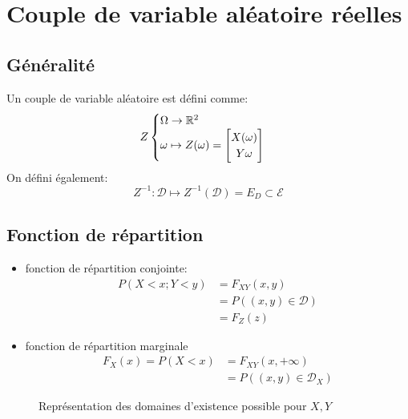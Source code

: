 \documentclass[main.tex]{subfiles}
\begin{document}
\section{Couple de variable aléatoire réelles}
\subsection{Généralité}
\begin{defin}
  Un couple de variable aléatoire est défini comme:
  \[
    Z
    \begin{cases}
      \Omega \to \mathbb{R}^2\\
      \omega \mapsto Z(\omega) = \begin{bmatrix} X(\omega)\\Y{\omega} \end{bmatrix}
    \end{cases}
  \]
  On défini également:
  \[
    Z^{-1} : \mathcal{D} \mapsto Z^{-1}(\mathcal{D}) = E_D \subset \mathcal{E}
  \]
\end{defin}
\subsection{Fonction de répartition}
\begin{defin}
  \begin{itemize}
  \item fonction de répartition conjointe:
    \begin{align*}
      P(X<x;Y<y) &=F_{XY}(x,y)\\
                 &=P((x,y)\in \mathcal{D})\\
                 &=F_Z(z)
    \end{align*}
  \item fonction de répartition marginale
    \begin{align*}
      F_{X}(x)=P(X<x) &= F_{XY}(x,+\infty)\\
                      &=P((x,y)\in\mathcal{D}_X)
    \end{align*}
  \end{itemize}
\end{defin}

\begin{figure}[H]
  \centering
  \caption{Représentation des domaines d'existence possible pour $X,Y$}
\end{figure}
\end{document}

